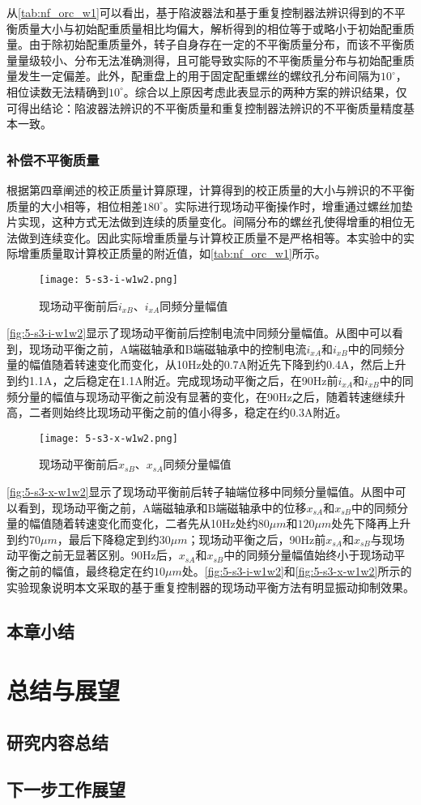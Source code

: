 从\autoref{tab:nf_orc_w1}可以看出，基于陷波器法和基于重复控制器法辨识得到的不平衡质量大小与初始配重质量相比均偏大，解析得到的相位等于或略小于初始配重质量。由于除初始配重质量外，转子自身存在一定的不平衡质量分布，而该不平衡质量量级较小、分布无法准确测得，且可能导致实际的不平衡质量分布与初始配重质量发生一定偏差。此外，配重盘上的用于固定配重螺丝的螺纹孔分布间隔为$10^{\circ}$，相位读数无法精确到$10^{\circ}$。综合以上原因考虑此表显示的两种方案的辨识结果，仅可得出结论：陷波器法辨识的不平衡质量和重复控制器法辨识的不平衡质量精度基本一致。

\subsection{补偿不平衡质量}

根据第四章阐述的校正质量计算原理，计算得到的校正质量的大小与辨识的不平衡质量的大小相等，相位相差$180^{\circ}$。实际进行现场动平衡操作时，增重通过螺丝加垫片实现，这种方式无法做到连续的质量变化。间隔分布的螺丝孔使得增重的相位无法做到连续变化。因此实际增重质量与计算校正质量不是严格相等。本实验中的实际增重质量取计算校正质量的附近值，如\autoref{tab:nf_orc_w1}所示。

\begin{figure}
	\texttt{[image: 5-s3-i-w1w2.png]}
	\caption{现场动平衡前后$i_{xB}$、$i_{xA}$同频分量幅值}
	\label{fig:5-s3-i-w1w2}
\end{figure}

\autoref{fig:5-s3-i-w1w2}显示了现场动平衡前后控制电流中同频分量幅值。从图中可以看到，现场动平衡之前，A端磁轴承和B端磁轴承中的控制电流$i_{xA}$和$i_{xB}$中的同频分量的幅值随着转速变化而变化，从10Hz处的0.7A附近先下降到约0.4A，然后上升到约1.1A，之后稳定在1.1A附近。完成现场动平衡之后，在90Hz前$i_{xA}$和$i_{xB}$中的同频分量的幅值与现场动平衡之前没有显著的变化，在90Hz之后，随着转速继续升高，二者则始终比现场动平衡之前的值小得多，稳定在约0.3A附近。

\begin{figure}
	\texttt{[image: 5-s3-x-w1w2.png]}
	\caption{现场动平衡前后$x_{sB}$、$x_{sA}$同频分量幅值}
	\label{fig:5-s3-x-w1w2}
\end{figure}

\autoref{fig:5-s3-x-w1w2}显示了现场动平衡前后转子轴端位移中同频分量幅值。从图中可以看到，现场动平衡之前，A端磁轴承和B端磁轴承中的位移$x_{sA}$和$x_{sB}$中的同频分量的幅值随着转速变化而变化，二者先从10Hz处约$80 \mu m$和$120 \mu m$处先下降再上升到约$70\mu m$，最后下降稳定到约$30 \mu m$；现场动平衡之后，90Hz前$x_{sA}$和$x_{sB}$与现场动平衡之前无显著区别。90Hz后，$x_{sA}$和$x_{sB}$中的同频分量幅值始终小于现场动平衡之前的幅值，最终稳定在约$10 \mu m$处。\autoref{fig:5-s3-i-w1w2}和\autoref{fig:5-s3-x-w1w2}所示的实验现象说明本文采取的基于重复控制器的现场动平衡方法有明显振动抑制效果。

\section{本章小结}

\chapter{总结与展望}
\section{研究内容总结}
\section{下一步工作展望}